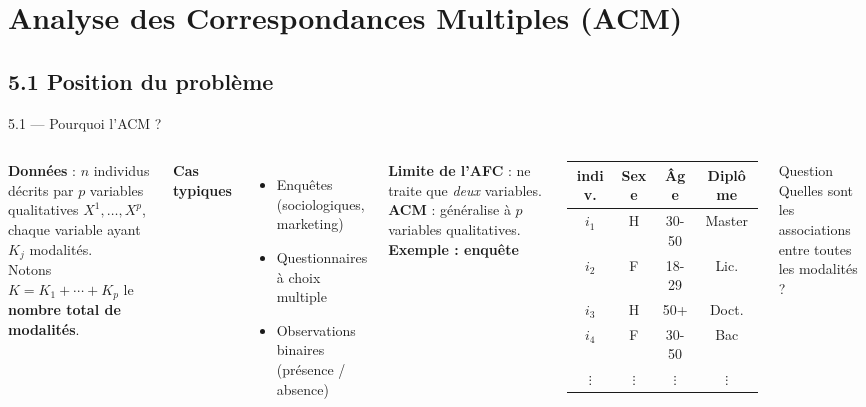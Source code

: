 \section{Analyse des Correspondances Multiples (ACM)}

\subsection{5.1 Position du problème}
\begin{frame}{5.1 — Pourquoi l'ACM ?}
\begin{columns}[T]
\textbf{Données} : $n$ individus décrits par $p$ variables \alert{qualitatives}
$X^1, \ldots, X^p$, chaque variable ayant $K_j$ modalités.\\[0.1cm]

Notons $K = K_1 + \cdots + K_p$ le \textbf{nombre total de modalités}.

\textbf{Cas typiques}
\begin{itemize}\small
  \item Enquêtes (sociologiques, marketing)
  \item Questionnaires à choix multiple
  \item Observations binaires (présence / absence)
\end{itemize}

\textbf{Limite de l'AFC} : ne traite que \emph{deux} variables.
\textbf{ACM} : généralise à $p$ variables qualitatives.
\centering
\footnotesize
\textbf{Exemple : enquête}
\renewcommand{\arraystretch}{1.05}
\begin{tabular}{c|ccc}
\toprule
indiv. & Sexe & Âge & Diplôme \\
\midrule
$i_1$ & H & 30-50 & Master \\
$i_2$ & F & 18-29 & Lic. \\
$i_3$ & H & 50+   & Doct. \\
$i_4$ & F & 30-50 & Bac \\
$\vdots$ & $\vdots$ & $\vdots$ & $\vdots$ \\
\bottomrule
\end{tabular}

\vspace{0.4cm}
\begin{block}{\small Question}
\small Quelles sont les associations entre toutes les modalités ?
\end{block}
\end{columns}
\end{frame}


